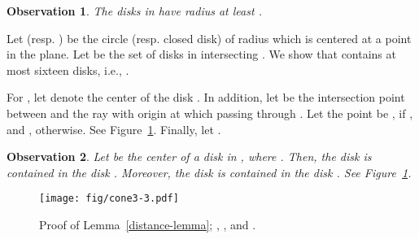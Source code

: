 \documentclass[11pt,a4paper]{article}
\newtheorem{observation}{Observation}
\begin{document}
\begin{observation}
 \label{radius-one}
The disks in  have radius at least .
\end{observation}

Let  (resp. ) be the circle (resp. closed disk) of radius  which is centered at a point  in the plane. 
Let  be the set of disks in  intersecting . We show that  contains at most sixteen disks, i.e., .

For , let  denote the center of the disk . 
In addition, let  be the intersection point between  and the ray with origin at  which passing through . Let the point  be , if , and , otherwise. See Figure~\ref{distance-fig}. Finally, let . 

\begin{observation}
\label{obs}
Let  be the center of a disk  in , where . Then, the disk  is contained in the disk . Moreover, the disk  is contained in the disk . See Figure~\ref{distance-fig}.
\end{observation}

\begin{figure}[htb]
  \centering
  \texttt{[image: fig/cone3-3.pdf]}
 \caption{Proof of Lemma~\ref{distance-lemma}; , , and .}
  \label{distance-fig}
\end{figure}
\end{document}
